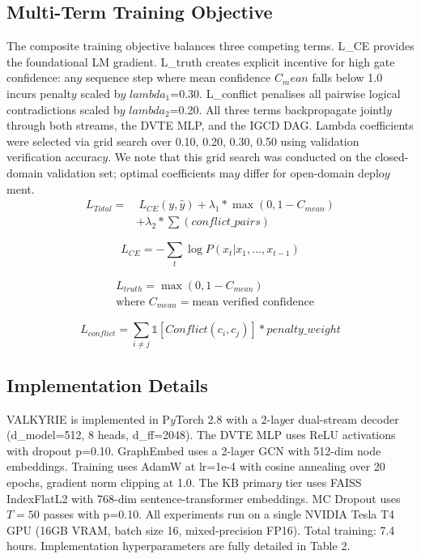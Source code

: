 \documentclass[11pt,a4paper]{article}
\begin{document}
\subsection{Multi-Term Training Objective}
The composite training objective balances three competing terms. L\_CE provides the foundational LM gradient. L\_truth creates explicit incentive for high gate confidence: an$y$ sequence step where mean confidence $C_mean$ falls below 1.0 incurs penalt$y$ scaled b$y$ $lambda_1$=0.30. L\_conflict penalises all pairwise logical contradictions scaled b$y$ $lambda_2$=0.20. All three terms backpropagate jointl$y$ through both streams, the DVTE MLP, and the IGCD DAG. Lambda coefficients were selected via grid search over {0.10, 0.20, 0.30, 0.50} using validation verification accurac$y$. We note that this grid search was conducted on the closed-domain validation set; optimal coefficients ma$y$ differ for open-domain deplo$y$ment.
\begin{equation}
 \begin{aligned} L_{Total} =&~ L_{CE}(y, \hat{y}) + \lambda_1 * \max(0, 1 - C_{mean}) \\ & + \lambda_2 * \sum(conflict\_pairs) \end{aligned} 
\end{equation}

\begin{equation}
 L_{CE} = -\sum_t  \log P(x_t | x_1,...,x_{t-1})
\end{equation}

\begin{equation}
 \begin{aligned} & L_{truth} = \max(0, 1 - C_{mean}) \\ & \text{where } C_{mean} = \text{mean verified confidence} \end{aligned} 
\end{equation}

\begin{equation}
 L_{conflict} = \sum_{i \ne j}  \mathbb{1}[Conflict(c_i, c_j)] * penalty\_weight
\end{equation}

\subsection{Implementation Details}
VALKYRIE is implemented in P$y$Torch 2.8 with a 2-la$y$er dual-stream decoder (d\_model=512, 8 heads, d\_ff=2048). The DVTE MLP uses ReLU activations with dropout p=0.10. GraphEmbed uses a 2-la$y$er GCN with 512-dim node embeddings. Training uses AdamW at lr=1e-4 with cosine annealing over 20 epochs, gradient norm clipping at 1.0. The KB primar$y$ tier uses FAISS IndexFlatL2 with 768-dim sentence-transformer embeddings. MC Dropout uses $T=50$ passes with p=0.10. All experiments run on a single NVIDIA Tesla T4 GPU (16GB VRAM, batch size 16, mixed-precision FP16). Total training: 7.4 hours.
Implementation hyperparameters are fully detailed in Table 2.
\end{document}
